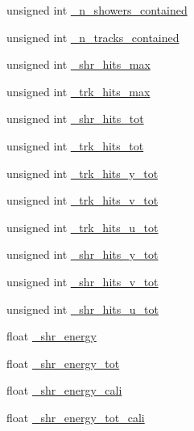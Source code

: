 \begin{DoxyCompactItemize}
\item 
unsigned int \hyperlink{classselection_1_1NuMuSelection_a8583770de84e76b78e7ddfb4b7e733da}{\+\_\+n\+\_\+showers\+\_\+contained}
\item 
unsigned int \hyperlink{classselection_1_1NuMuSelection_a4f7501393a59de50a8547b6ff2f286b8}{\+\_\+n\+\_\+tracks\+\_\+contained}
\item 
unsigned int \hyperlink{classselection_1_1NuMuSelection_ab314b2264e547d258e88d2f773352b9f}{\+\_\+shr\+\_\+hits\+\_\+max}
\item 
unsigned int \hyperlink{classselection_1_1NuMuSelection_a3e0166490638c0d08a3b66de9ed1ec91}{\+\_\+trk\+\_\+hits\+\_\+max}
\item 
unsigned int \hyperlink{classselection_1_1NuMuSelection_a9233cd2b1aa05f66da7c04f99ff99058}{\+\_\+shr\+\_\+hits\+\_\+tot}
\item 
unsigned int \hyperlink{classselection_1_1NuMuSelection_abcc3673c89468d4af37e7936ac5716ea}{\+\_\+trk\+\_\+hits\+\_\+tot}
\item 
unsigned int \hyperlink{classselection_1_1NuMuSelection_a7c0ae4ea16390adf8803846578ad2d05}{\+\_\+trk\+\_\+hits\+\_\+y\+\_\+tot}
\item 
unsigned int \hyperlink{classselection_1_1NuMuSelection_adf551288be333a585b4fe8b111b8d3dc}{\+\_\+trk\+\_\+hits\+\_\+v\+\_\+tot}
\item 
unsigned int \hyperlink{classselection_1_1NuMuSelection_ab9a14b2e6823b5309c44d17e343087c6}{\+\_\+trk\+\_\+hits\+\_\+u\+\_\+tot}
\item 
unsigned int \hyperlink{classselection_1_1NuMuSelection_a2d08099d9037a3bc8b3b5c7de3de4b4f}{\+\_\+shr\+\_\+hits\+\_\+y\+\_\+tot}
\item 
unsigned int \hyperlink{classselection_1_1NuMuSelection_aa2d62d528b55bfbb0964fa68f2d0ff04}{\+\_\+shr\+\_\+hits\+\_\+v\+\_\+tot}
\item 
unsigned int \hyperlink{classselection_1_1NuMuSelection_aa88c0578a68ec301fecbe3262aa44762}{\+\_\+shr\+\_\+hits\+\_\+u\+\_\+tot}
\item 
float \hyperlink{classselection_1_1NuMuSelection_a06ebfacd01494668815b794a793e58cf}{\+\_\+shr\+\_\+energy}
\item 
float \hyperlink{classselection_1_1NuMuSelection_a73da6cca89a0a1a854297f4d0a2ac851}{\+\_\+shr\+\_\+energy\+\_\+tot}
\item 
float \hyperlink{classselection_1_1NuMuSelection_a902fba92b860066bac4ba35e1e014891}{\+\_\+shr\+\_\+energy\+\_\+cali}
\item 
float \hyperlink{classselection_1_1NuMuSelection_a1401935e64b23d52ece082c731c87624}{\+\_\+shr\+\_\+energy\+\_\+tot\+\_\+cali}

\end{DoxyCompactItemize}

